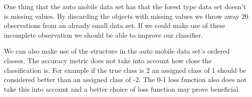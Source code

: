 One thing that the auto mobile data set has that the forest type data set doesn't is missing values.
By discarding the objects with missing values we throw away $20$ observations from an already small data set.
If we could make use of these incomplete observation we should be able to improve our classifier.

We can also make use of the structure in the auto mobile data set's ordered classes.
The accuracy metric does not take into account how close the classification is.
For example if the true class is 2 an assigned class of 1 should be considered better than an assigned class of -2.
The 0-1 loss function also does not take this into account and a better choice of loss function may prove beneficial.

